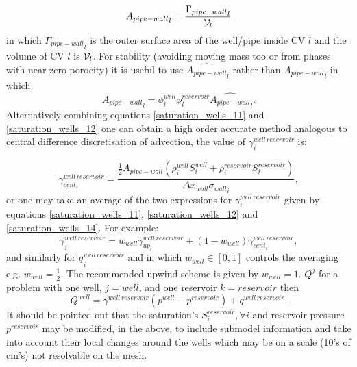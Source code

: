 \begin{equation}
{A_{pipe-wall}}_l =  \frac{  {\Gamma_{pipe-wall}}_l  }{ {\cal V}_l }
\label{saturation_wells_12b}
\end{equation}
in which ${\Gamma_{pipe-wall}}_l$ is the outer surface area of the well/pipe inside CV $l$ 
and the volume of CV $l$ is ${\cal V}_l$. 
For stability (avoiding moving mass too or from phases with near zero porocity) it is useful to use $\widehat{A_{pipe-wall}}_l$ rather than ${A_{pipe-wall}}_l$ in which 
\begin{equation}
{A_{pipe-wall}}_l =  \phi^{well}_l \phi^{reservoir}_l \widehat{ A_{pipe-wall}}_l. 
\label{saturation_wells_12b-hat}
\end{equation}
Alternatively combining equations \ref{saturation_wells_11} and \ref{saturation_wells_12} 
one can obtain a high order accurate method analogous to central difference discretisation 
of advection, the value of $\gamma_i^{well\, reservoir}$ is:

\begin{equation}
\gamma_{cent_i}^{well\, reservoir}=
\frac{\frac{1}{2} A_{pipe-wall}  (\rho_i^{well}  S_i^{well} + \rho_i^{reservoir}  S_i^{reservoir}) }{{{\Delta x}_{wall}\sigma_{wall}}_i}, 
\label{saturation_wells_14}
\end{equation}
or one may take an average of the two expressions for $\gamma_i^{well\, reservoir}$ given by equations 
\ref{saturation_wells_11}, \ref{saturation_wells_12} and 
\ref{saturation_wells_14}. For example:
\begin{equation}
{\gamma_{}}_i^{well\, reservoir}=
w_{well}{\gamma_{up_i}^{well\, reservoir}}+ 
(1-w_{well}){\gamma_{cent_i}^{well\, reservoir}} , 
\label{saturation_wells_14b}
\end{equation}
and similarly for ${q_{}}_i^{well\, reservoir}$ and 
in which $w_{well}\in\left[0,1\right]$ controls the averaging e.g. $w_{well}=\frac{1}{2}$. 
The recommended upwind scheme is given by $w_{well}=1$. 
$Q^j$ for a problem with one well, $j=well$, and one reservoir  $k=reservoir$ then 
\begin{equation}
Q^{well}=\gamma^{well\, reservoir} (p^{well}-p^{reservoir}) + q^{well\, reservoir}. 
\label{saturation_wells_14bb}
\end{equation}
It should be pointed out that the saturation's $S_i^{reservoir}, \forall i$ and 
reservoir pressure $p^{reservoir}$ may be modified, in the above, 
to include submodel information 
and take into account their local changes around the wells which may be on a scale (10's of cm's) 
not resolvable on the mesh. 




